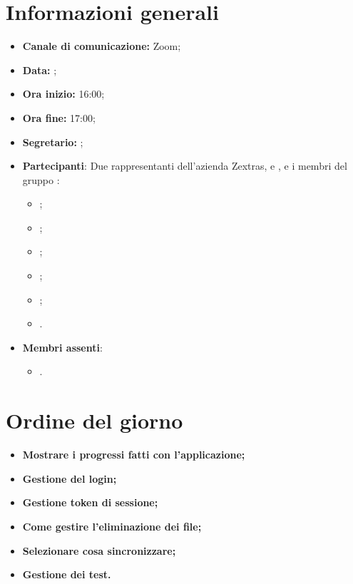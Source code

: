 \section{Informazioni generali}

\begin{itemize}

    \item \textbf{Canale di comunicazione:} Zoom;

    \item \textbf{Data:} \DataMeeting{};

    \item \textbf{Ora inizio:} 16:00;

    \item \textbf{Ora fine:} 17:00;

    \item \textbf{Segretario:} \ACapoRedazione{};

    \item \textbf{Partecipanti}: Due rappresentanti dell'azienda Zextras, \textit{\Alessio{}} e \textit{\Federico{}}, e i membri del gruppo \Gruppo{}:
        \begin{itemize}
            \item \Daniele{};
            \item \Davide{};
            \item \Francesco{};
            \item \Giosue{};
            \item \Lucrezia{};
            \item \Matteo{}.
        \end{itemize}
    \item \textbf{Membri assenti}:
        \begin{itemize}
            \item \Tommaso{}.
        \end{itemize}
\end{itemize}

\section{Ordine del giorno}

\begin{itemize}
    \item\textbf{Mostrare i progressi fatti con l'applicazione;}
    \item\textbf{Gestione del login;}
    \item\textbf{Gestione token di sessione;}
    \item\textbf{Come gestire l'eliminazione dei file;}
    \item\textbf{Selezionare cosa sincronizzare;}
    \item\textbf{Gestione dei test.}
\end{itemize}
\newpage


